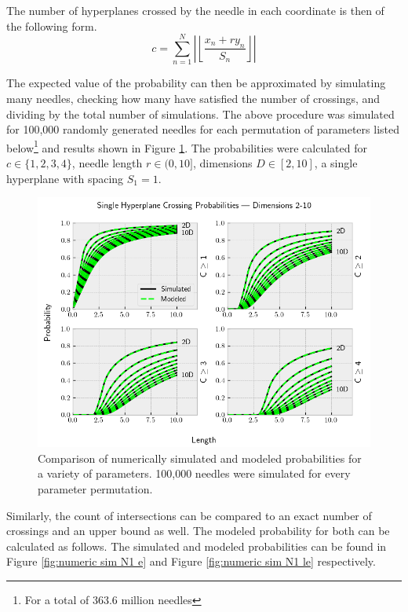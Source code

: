 \documentclass{article}
\begin{document}
The number of hyperplanes crossed by the needle in each coordinate is then of the following form.
\begin{equation}
	c = \sum_{n=1}^{N} \left|\left\lfloor \frac{x_n+r y_n}{S_n} \right\rfloor\right|
\end{equation}

The expected value of the probability can then be approximated by simulating many needles, checking
how many have satisfied the number of crossings, and dividing by the total number of simulations.
The above procedure was simulated for 100,000 randomly generated needles for each permutation of parameters
listed below\footnote{For a total of 363.6 million needles} and results shown in Figure \ref{fig:numeric sim N1}. The probabilities were calculated for
$c\in\{1,2,3,4\}$, needle length $r\in(0, 10]$, dimensions $D\in[2, 10]$, a single hyperplane with
spacing $S_1=1$.

\begin{figure}
	\centerline{\includegraphics[width=5in]{numeric_sim_N1.png}}
	\caption{Comparison of numerically simulated and modeled probabilities for a variety of parameters.
	100,000 needles were simulated for every parameter permutation.}
	\label{fig:numeric sim N1}
\end{figure}

Similarly, the count of intersections can be compared to an exact number of crossings and an upper
bound as well. The modeled probability for both can be calculated as follows. The simulated and modeled
probabilities can be found in Figure \ref{fig:numeric sim N1 e} and Figure \ref{fig:numeric sim N1 le} respectively.
\end{document}
